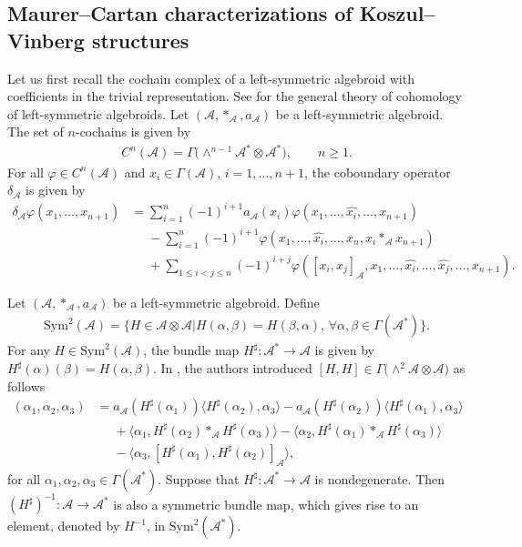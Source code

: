 \documentclass[10pt,a4paper]{amsart}
\numberwithin{equation}{section}
\newcommand{\huaA}{\mathcal{A}}
\newcommand{\Sym}{\mathrm{Sym}}
\begin{document}
\subsection{Maurer--Cartan characterizations of Koszul--Vinberg structures}
Let us first recall the cochain complex of a left-symmetric algebroid with coefficients in the trivial representation. See \cite{LiuShengBaiChen} for the general theory of cohomology of left-symmetric algebroids. Let $(\huaA,\ast_\huaA,a_\huaA)$ be a left-symmetric algebroid. The set of $n$-cochains is given by
\begin{gather*}
C^{n}(\huaA)=\Gamma\big({\wedge}^{n-1}\huaA^*\otimes \huaA^*\big),\qquad
n\geq1.
\end{gather*}
For all $\varphi\in C^{n}(\huaA)$ and $x_i\in \Gamma(\huaA)$, $i=1,\dots,n+1$, the coboundary operator
$\delta_\huaA$ is given by
 \begin{align}
\delta_\huaA\varphi(x_1,\dots,x_{n+1})
 &=\sum_{i=1}^{n}(-1)^{i+1}a_\huaA(x_i)\varphi(x_1,\dots,\hat{x_i},\dots,x_{n+1})\nonumber
 \\
&\phantom{=}-\sum_{i=1}^{n}(-1)^{i+1}\varphi(x_1,\dots,\hat{x_i},\dots,x_n,x_i\ast_\huaA x_{n+1})\nonumber
\\
&\phantom{=}+\sum_{1\leq i<j\leq n}(-1)^{i+j}\varphi([x_i,x_j]_\huaA,x_1,\dots,\hat{x_i},\dots,\hat{x_j},\dots,x_{n+1}).
\label{LSCA cohomology}
\end{align}


Let $(\huaA,\ast_\huaA,a_\huaA)$ be a left-symmetric algebroid. Define
\begin{gather*}
\Sym^2(\huaA)=\{H\in \huaA\otimes \huaA| H(\alpha,\beta)=H(\beta,\alpha),\,
\forall\alpha,\beta\in \Gamma(\huaA^*)\}.
\end{gather*}
For any $H\in \Sym^2(\huaA)$, the bundle map $H^\sharp\colon \huaA^*\longrightarrow \huaA$ is given by $H^\sharp(\alpha)(\beta)=H(\alpha,\beta)$.
In \cite{lsb2}, the authors introduced $[ H,H]\in\Gamma\big({\wedge}^2\huaA \otimes \huaA\big) $ as follows
\begin{align}
[H,H](\alpha_1,\alpha_2,\alpha_3)&=a_\huaA(H^\sharp(\alpha_1))\langle H^\sharp(\alpha_2),\alpha_3\rangle-a_\huaA(H^\sharp(\alpha_2))\langle H^\sharp(\alpha_1),\alpha_3\rangle\nonumber
\\
&\phantom{=}+\langle \alpha_1,H^\sharp(\alpha_2)\ast_\huaA H^\sharp(\alpha_3)\rangle-\langle\alpha_2,H^\sharp(\alpha_1)\ast_\huaA H^\sharp(\alpha_3)\rangle
\nonumber
\\
&\phantom{=}-\langle \alpha_3,[H^\sharp(\alpha_1),
H^\sharp(\alpha_2)]_\huaA\rangle,\label{brac2}
\end{align}
for all $\alpha_1,\alpha_2,\alpha_3\in\Gamma(\huaA^*)$. Suppose that $H^\sharp\colon \huaA^*\longrightarrow \huaA$ is nondegenerate. Then $(H^\sharp)^{-1}\colon \huaA\longrightarrow \huaA^*$ is also a symmetric bundle map, which gives rise to an element, denoted by $H^{-1}$, in $\Sym^2(\huaA^*)$.
\end{document}

